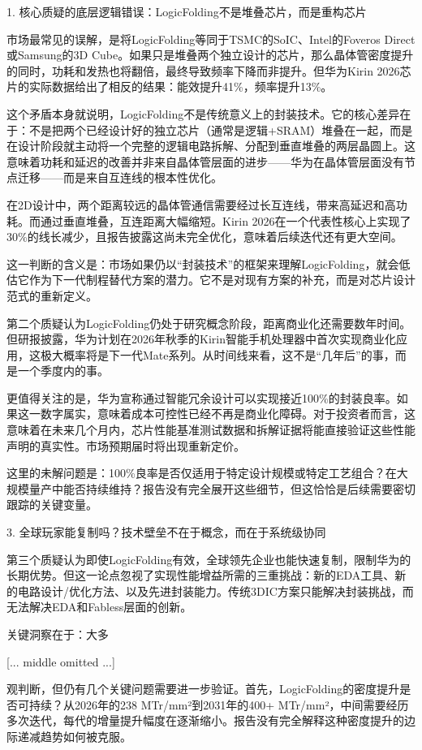 \documentclass[11pt]{ctexart}
\begin{document}
1. 核心质疑的底层逻辑错误：LogicFolding不是堆叠芯片，而是重构芯片

市场最常见的误解，是将LogicFolding等同于TSMC的SoIC、Intel的Foveros Direct或Samsung的3D Cube。如果只是堆叠两个独立设计的芯片，那么晶体管密度提升的同时，功耗和发热也将翻倍，最终导致频率下降而非提升。但华为Kirin 2026芯片的实际数据给出了相反的结果：能效提升41\%，频率提升13\%。

这个矛盾本身就说明，LogicFolding不是传统意义上的封装技术。它的核心差异在于：不是把两个已经设计好的独立芯片（通常是逻辑+SRAM）堆叠在一起，而是在设计阶段就主动将一个完整的逻辑电路拆解、分配到垂直堆叠的两层晶圆上。这意味着功耗和延迟的改善并非来自晶体管层面的进步——华为在晶体管层面没有节点迁移——而是来自互连线的根本性优化。

在2D设计中，两个距离较远的晶体管通信需要经过长互连线，带来高延迟和高功耗。而通过垂直堆叠，互连距离大幅缩短。Kirin 2026在一个代表性核心上实现了30\%的线长减少，且报告披露这尚未完全优化，意味着后续迭代还有更大空间。

这一判断的含义是：市场如果仍以“封装技术”的框架来理解LogicFolding，就会低估它作为下一代制程替代方案的潜力。它不是对现有方案的补充，而是对芯片设计范式的重新定义。

第二个质疑认为LogicFolding仍处于研究概念阶段，距离商业化还需要数年时间。但研报披露，华为计划在2026年秋季的Kirin智能手机处理器中首次实现商业化应用，这极大概率将是下一代Mate系列。从时间线来看，这不是“几年后”的事，而是一个季度内的事。

更值得关注的是，华为宣称通过智能冗余设计可以实现接近100\%的封装良率。如果这一数字属实，意味着成本可控性已经不再是商业化障碍。对于投资者而言，这意味着在未来几个月内，芯片性能基准测试数据和拆解证据将能直接验证这些性能声明的真实性。市场预期届时将出现重新定价。

这里的未解问题是：100\%良率是否仅适用于特定设计规模或特定工艺组合？在大规模量产中能否持续维持？报告没有完全展开这些细节，但这恰恰是后续需要密切跟踪的关键变量。

3. 全球玩家能复制吗？技术壁垒不在于概念，而在于系统级协同

第三个质疑认为即使LogicFolding有效，全球领先企业也能快速复制，限制华为的长期优势。但这一论点忽视了实现性能增益所需的三重挑战：新的EDA工具、新的电路设计/优化方法、以及先进封装能力。传统3DIC方案只能解决封装挑战，而无法解决EDA和Fabless层面的创新。

关键洞察在于：大多

[... middle omitted ...]

观判断，但仍有几个关键问题需要进一步验证。首先，LogicFolding的密度提升是否可持续？从2026年的238 MTr/mm²到2031年的400+ MTr/mm²，中间需要经历多次迭代，每代的增量提升幅度在逐渐缩小。报告没有完全解释这种密度提升的边际递减趋势如何被克服。
\end{document}
